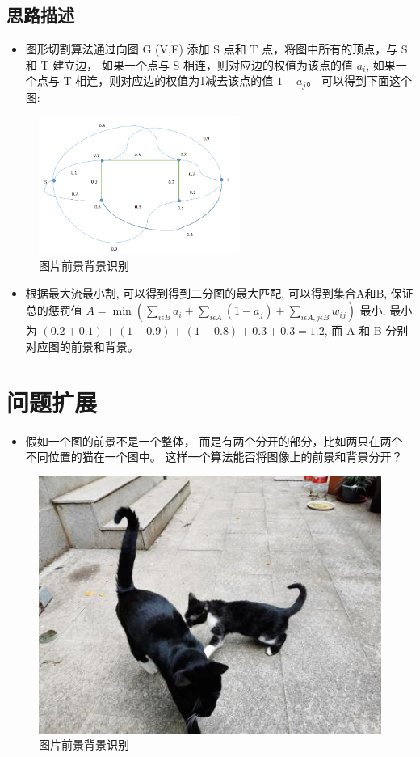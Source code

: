 \subsection{思路描述}
\begin{itemize}
	\item 图形切割算法通过向图 G (V,E) 添加 S 点和 T 点，将图中所有的顶点，与 S 和 T 建立边，
	      如果一个点与 S 相连，则对应边的权值为该点的值 $a_i$, 如果一个点与 T 相连，则对应边的权值为1减去该点的值 $ 1 - a_j $。
	      可以得到下面这个图:
\end{itemize}

\begin{figure}[htb]
	\centering
	\includegraphics[height=4.5cm]{image/Image-segmentation3.png}
	\caption{图片前景背景识别}\label{fig:image-seg-2}
\end{figure}

\begin{itemize}
	\item   根据最大流最小割, 可以得到得到二分图的最大匹配, 可以得到集合A和B, 保证总的惩罚值 $ A = \min\left(\sum_{i \epsilon B}a_i +  \sum_{i \epsilon A}(1 - a_j) + \sum_{i \epsilon A, j \epsilon B}w_{ij} \right) $ 最小,
	      最小为 $(0.2 + 0.1) + (1 - 0.9) + (1 - 0.8) + 0.3 + 0.3 = 1.2 $, 而 A 和 B 分别对应图的前景和背景。
\end{itemize}

\section{问题扩展}
\begin{itemize}
	\item 假如一个图的前景不是一个整体，
	      而是有两个分开的部分，比如两只在两个不同位置的猫在一个图中。
	      这样一个算法能否将图像上的前景和背景分开？
\end{itemize}

\begin{figure}[htb]
	\centering
	\includegraphics[scale=0.6]{image/Image-segmentation1.png}
	\caption{图片前景背景识别}\label{fig:image-seg-3}
\end{figure}

